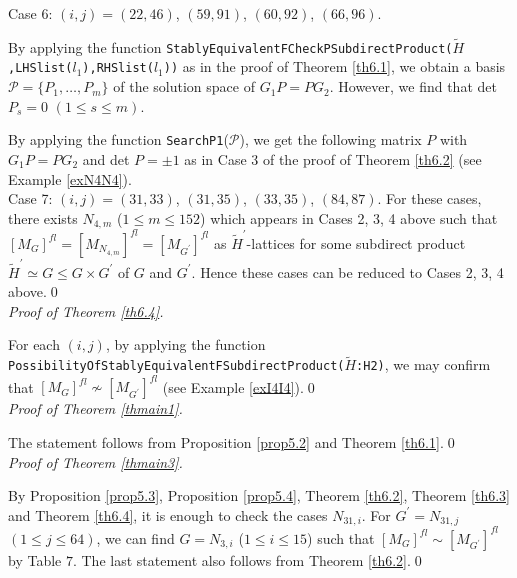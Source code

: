 \documentclass{amsart}
\theoremstyle{plain}
\theoremstyle{definition}
\theoremstyle{remark}
\newcounter{sub}\def\tr{\mbox{tr }}
\begin{document}
Case 6: $(i,j)=(22,46)$, $(59,91)$, $(60,92)$, $(66,96)$. 

By applying the function 
{\tt StablyEquivalentFCheckPSubdirectProduct($\widetilde{H}$,LHSlist($l_1$),RHSlist($l_1$))} as in the proof of Theorem \ref{th6.1}, 
we obtain a basis 
$\mathcal{P}=\{P_1,\dots,P_m\}$ of the solution space of $G_1P=PG_2$. 
However, we find that det $P_s=0$ $(1\leq s\leq m)$. 

By applying the function {\tt SearchP1}($\mathcal{P}$), 
we get the following matrix $P$ with $G_1P=PG_2$ and det $P=\pm 1$ 
as in Case 3 of the proof of Theorem \ref{th6.2} 
(see Example \ref{exN4N4}).\\

Case 7: $(i,j)=(31,33)$, $(31,35)$, $(33,35)$, $(84,87)$. 
For these cases, 
there exists $N_{4,m}$ ($1\leq m\leq 152$) which appears in 
Cases 2, 3, 4 above 
such that 
$[M_G]^{fl}=[M_{N_{4,m}}]^{fl}=[M_{G^\prime}]^{fl}$ 
as $\widetilde{H}^\prime$-lattices for some subdirect product 
$\widetilde{H}^\prime\simeq G\leq G\times G^\prime$ 
of $G$ and $G^\prime$. 
Hence these cases can be reduced to Cases 2, 3, 4 above.\qed\\

{\it Proof of Theorem \ref{th6.4}.}

%
%
For each $(i,j)$, by applying the function 
{\tt PossibilityOfStablyEquivalentFSubdirectProduct($\widetilde{H}$:H2)}, 
we may confirm that 
$[M_G]^{fl}\not\sim [M_{G^\prime}]^{fl}$ 
(see Example \ref{exI4I4}).\qed\\

{\it Proof of Theorem \ref{thmain1}.}

The statement follows from 
Proposition \ref{prop5.2} and Theorem \ref{th6.1}.\qed\\

{\it Proof of Theorem \ref{thmain3}.}

By Proposition \ref{prop5.3}, Proposition \ref{prop5.4}, 
Theorem \ref{th6.2}, Theorem \ref{th6.3} and Theorem \ref{th6.4}, 
it is enough to check the cases $N_{31,i}$. 
For $G^\prime=N_{31,j}$ $(1\leq j\leq 64)$, 
we can find $G=N_{3,i}$ ($1\leq i\leq 15$) 
such that $[M_G]^{fl}\sim [M_{G^\prime}]^{fl}$ by Table $7$. 
%
The last statement also follows from %
Theorem \ref{th6.2}.\qed
\end{document}
